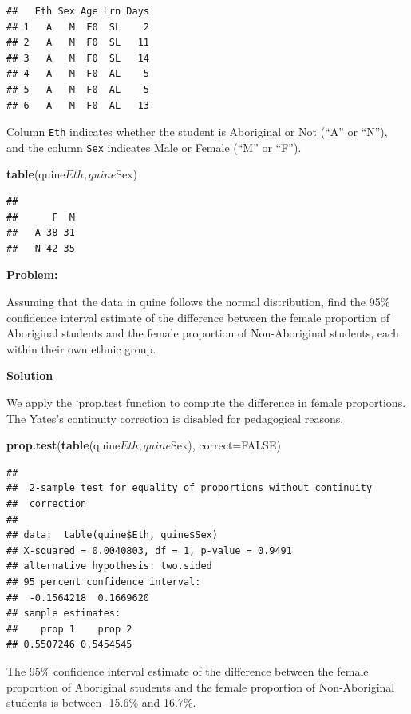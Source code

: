 \documentclass[]{article}
\newenvironment{Shaded}{\begin{snugshade}}{\end{snugshade}}
\newcommand{\KeywordTok}[1]{\textcolor[rgb]{0.13,0.29,0.53}{\textbf{{#1}}}}
\newcommand{\DataTypeTok}[1]{\textcolor[rgb]{0.13,0.29,0.53}{{#1}}}
\newcommand{\OtherTok}[1]{\textcolor[rgb]{0.56,0.35,0.01}{{#1}}}
\newcommand{\NormalTok}[1]{{#1}}
\numberwithin{equation}{section}
\begin{document}
\begin{verbatim}
##   Eth Sex Age Lrn Days
## 1   A   M  F0  SL    2
## 2   A   M  F0  SL   11
## 3   A   M  F0  SL   14
## 4   A   M  F0  AL    5
## 5   A   M  F0  AL    5
## 6   A   M  F0  AL   13
\end{verbatim}

Column \texttt{Eth} indicates whether the student is Aboriginal or Not
(``A'' or ``N''), and the column \texttt{Sex} indicates Male or Female
(``M'' or ``F'').

\begin{Shaded}
\begin{Highlighting}[]
\KeywordTok{table}\NormalTok{(quine$Eth,quine$Sex)}
\end{Highlighting}
\end{Shaded}

\begin{verbatim}
##    
##      F  M
##   A 38 31
##   N 42 35
\end{verbatim}

\textbf{Problem:}

Assuming that the data in quine follows the normal distribution, find
the 95\% confidence interval estimate of the difference between the
female proportion of Aboriginal students and the female proportion of
Non-Aboriginal students, each within their own ethnic group.

\textbf{Solution}

We apply the `prop.test function to compute the difference in female
proportions. The Yates's continuity correction is disabled for
pedagogical reasons.

\begin{Shaded}
\begin{Highlighting}[]
\KeywordTok{prop.test}\NormalTok{(}\KeywordTok{table}\NormalTok{(quine$Eth, quine$Sex), }\DataTypeTok{correct=}\OtherTok{FALSE}\NormalTok{) }
\end{Highlighting}
\end{Shaded}

\begin{verbatim}
## 
##  2-sample test for equality of proportions without continuity
##  correction
## 
## data:  table(quine$Eth, quine$Sex)
## X-squared = 0.0040803, df = 1, p-value = 0.9491
## alternative hypothesis: two.sided
## 95 percent confidence interval:
##  -0.1564218  0.1669620
## sample estimates:
##    prop 1    prop 2 
## 0.5507246 0.5454545
\end{verbatim}

The 95\% confidence interval estimate of the difference between the
female proportion of Aboriginal students and the female proportion of
Non-Aboriginal students is between -15.6\% and 16.7\%.
\end{document}
